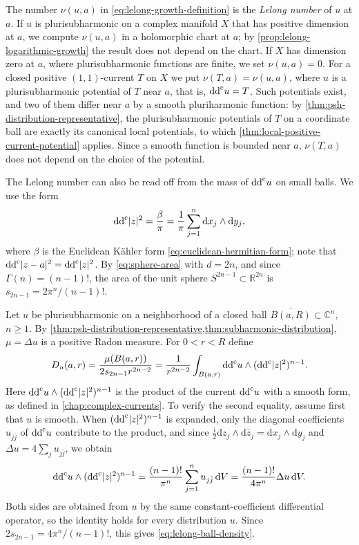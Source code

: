\begin{definition}\label{def:lelong-number}
The number $\nu(u,a)$ in \eqref{eq:lelong-growth-definition} is the \emph{Lelong number} of $u$ at $a$. If $u$ is plurisubharmonic on a complex manifold $X$ that has positive dimension at $a$, we compute $\nu(u,a)$ in a holomorphic chart at $a$; by \cref{prop:lelong-logarithmic-growth} the result does not depend on the chart. If $X$ has dimension zero at $a$, where plurisubharmonic functions are finite, we set $\nu(u,a)=0$. For a closed positive $(1,1)$-current $T$ on $X$ we put $\nu(T,a)=\nu(u,a)$, where $u$ is a plurisubharmonic potential of $T$ near $a$, that is, $\mathrm{dd}^{\mathrm{c}} u=T$. Such potentials exist, and two of them differ near $a$ by a smooth pluriharmonic function: by \cref{thm:psh-distribution-representative}, the plurisubharmonic potentials of $T$ on a coordinate ball are exactly its canonical local potentials, to which \cref{thm:local-positive-current-potential} applies. Since a smooth function is bounded near $a$, $\nu(T,a)$ does not depend on the choice of the potential.
\end{definition}

The Lelong number can also be read off from the mass of $\mathrm{dd}^{\mathrm{c}} u$ on small balls. We use the form
\[
 \mathrm{dd}^{\mathrm{c}}|z|^2=\frac{\beta}{\pi}=\frac1\pi\sum_{j=1}^n\mathrm dx_j\wedge\mathrm dy_j,
\]
where $\beta$ is the Euclidean K\"ahler form \eqref{eq:euclidean-hermitian-form}; note that $\mathrm{dd}^{\mathrm{c}}|z-a|^2=\mathrm{dd}^{\mathrm{c}}|z|^2$. By \eqref{eq:sphere-area} with $d=2n$, and since $\Gamma(n)=(n-1)!$, the area of the unit sphere $S^{2n-1}\subset\mathbb R^{2n}$ is $s_{2n-1}=2\pi^n/(n-1)!$.

Let $u$ be plurisubharmonic on a neighborhood of a closed ball $\overline{B(a,R)}\subset\mathbb C^n$, $n\geq1$. By \cref{thm:psh-distribution-representative,thm:subharmonic-distribution}, $\mu=\Delta u$ is a positive Radon measure. For $0<r<R$ define
\begin{equation}\label{eq:lelong-ball-density}
 D_u(a,r)=\frac{\mu(B(a,r))}{2s_{2n-1}r^{2n-2}}
    =\frac1{r^{2n-2}}\int_{B(a,r)}\mathrm{dd}^{\mathrm{c}} u\wedge(\mathrm{dd}^{\mathrm{c}}|z|^2)^{n-1}.
\end{equation}
Here $\mathrm{dd}^{\mathrm{c}} u\wedge(\mathrm{dd}^{\mathrm{c}}|z|^2)^{n-1}$ is the product of the current $\mathrm{dd}^{\mathrm{c}} u$ with a smooth form, as defined in \cref{chap:complex-currents}. To verify the second equality, assume first that $u$ is smooth. When $(\mathrm{dd}^{\mathrm{c}}|z|^2)^{n-1}$ is expanded, only the diagonal coefficients $u_{j\bar j}$ of $\mathrm{dd}^{\mathrm{c}} u$ contribute to the product, and since $\frac{\mathrm i}{2}\mathrm dz_j\wedge\mathrm d\bar z_j=\mathrm dx_j\wedge\mathrm dy_j$ and $\Delta u=4\sum_ju_{j\bar j}$, we obtain
\[
 \mathrm{dd}^{\mathrm{c}} u\wedge(\mathrm{dd}^{\mathrm{c}}|z|^2)^{n-1}=\frac{(n-1)!}{\pi^n}\sum_{j=1}^nu_{j\bar j}\,\mathrm dV
       =\frac{(n-1)!}{4\pi^n}\Delta u\,\mathrm dV.
\]
Both sides are obtained from $u$ by the same constant-coefficient differential operator, so the identity holds for every distribution $u$. Since $2s_{2n-1}=4\pi^n/(n-1)!$, this gives \eqref{eq:lelong-ball-density}.

